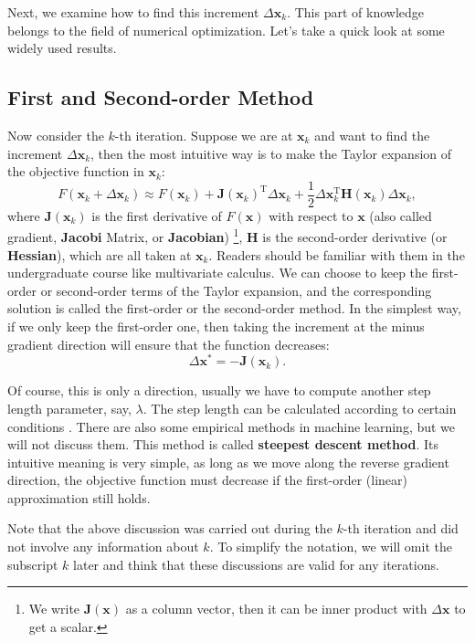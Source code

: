 Next, we examine how to find this increment $\Delta \bm{x}_k$. This part of knowledge belongs to the field of numerical optimization. Let's take a quick look at some widely used results.

\subsection{First and Second-order Method}
Now consider the $k$-th iteration. Suppose we are at $\bm{x}_k$ and want to find the increment $\Delta \bm{x}_k$, then the most intuitive way is to make the Taylor expansion of the objective function in $\bm{x}_k$:
\begin{equation}
    F(\bm{x}_k+\Delta \bm{x}_k) \approx F{\left( \bm{x}_k \right)} + \bm{J} \left( \bm{x}_k \right) ^\mathrm{T} \Delta \bm{x}_k + \frac{1}{2}\Delta {\bm{x}_k^\mathrm{T}}\bm{H}(\bm{ x}_k) \Delta \bm{x}_k,
\end{equation}
where $\bm{J}(\bm{x}_k)$ is the first derivative of $F(\bm{x})$ with respect to $\bm{x}$ (also called gradient, \textbf{Jacobi} Matrix, or \textbf{Jacobian}) \footnote{We write $\bm{J}(\bm{x})$ as a column vector, then it can be inner product with $\Delta \bm{x}$ to get a scalar. }, $\bm{H}$ is the second-order derivative (or \textbf{Hessian}), which are all taken at $\bm{x}_k$. Readers should be familiar with them in the undergraduate course like multivariate calculus. We can choose to keep the first-order or second-order terms of the Taylor expansion, and the corresponding solution is called the first-order or the second-order method. In the simplest way, if we only keep the first-order one, then taking the increment at the minus gradient direction will ensure that the function decreases: 
\begin{equation}
    \Delta \bm{x}^* =-\bm{J}(\bm{x}_k).
\end{equation}

Of course, this is only a direction, usually we have to compute another step length parameter, say, $\lambda$. The step length can be calculated according to certain conditions \textsuperscript{\cite{Wolfe1969}}. There are also some empirical methods in machine learning, but we will not discuss them. This method is called \textbf{steepest descent method}. Its intuitive meaning is very simple, as long as we move along the reverse gradient direction, the objective function must decrease if the first-order (linear) approximation still holds.

Note that the above discussion was carried out during the $k$-th iteration and did not involve any information about $k$. To simplify the notation, we will omit the subscript $k$ later and think that these discussions are valid for any iterations.

